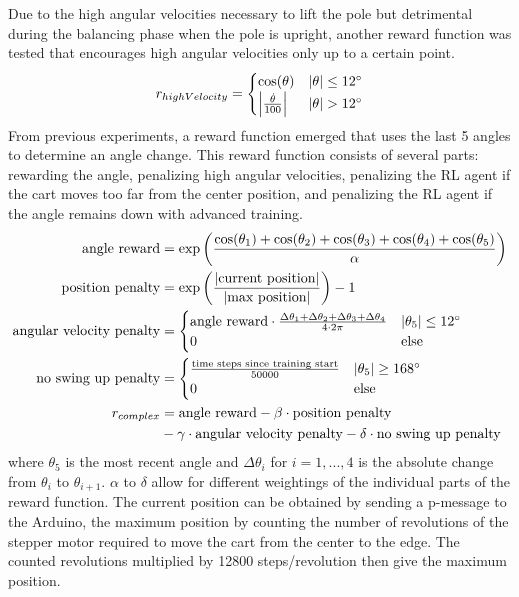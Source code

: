 Due to the high angular velocities necessary to lift the pole but detrimental during the balancing phase when the pole is upright, another reward function was tested that encourages high angular velocities only up to a certain point.
\begin{align}
    r_{highVelocity} = \begin{cases}
        \cos(\theta) & \vert\theta\vert \le 12^\circ \\
        \left|\frac{\dot{\theta}}{100}\right| & \vert\theta\vert > 12^\circ
    \end{cases} \notag
\end{align}
From previous experiments, a reward function emerged that uses the last 5 angles to determine an angle change. This reward function consists of several parts: rewarding the angle, penalizing high angular velocities, penalizing the RL agent if the cart moves too far from the center position, and penalizing the RL agent if the angle remains down with advanced training.
\begin{align}
    \text{angle reward} &= \exp\left(\frac{\cos(\theta_1) + \cos(\theta_2) + \cos(\theta_3) + \cos(\theta_4) + \cos(\theta_5)}{\alpha}\right) \notag \\
    \text{position penalty} &= \exp\left(\frac{\vert\text{current position}\vert}{\vert\text{max position}\vert}\right)-1 \notag \\
    \text{angular velocity penalty} &= \begin{cases}
        \text{angle reward}\cdot\frac{\Delta\theta_1 + \Delta\theta_2 + \Delta\theta_3 + \Delta\theta_4}{4\cdot 2\pi} & \vert\theta_5\vert \le 12^\circ \\
        0 & \text{else}
    \end{cases} \notag \\
    \text{no swing up penalty} &= \begin{cases}
        \frac{\text{time steps since training start}}{50000} & \vert\theta_5\vert \ge 168^\circ \\
        0 & \text{else}
    \end{cases} \notag \\
    r_{complex} &= \text{angle reward} - \beta\cdot \text{position penalty} \notag \\
    &- \gamma\cdot \text{angular velocity penalty} - \delta\cdot \text{no swing up penalty} \notag
\end{align}
where $\theta_5$ is the most recent angle and $\Delta\theta_i$ for $i=1,...,4$ is the absolute change from $\theta_i$ to $\theta_{i+1}$. $\alpha$ to $\delta$ allow for different weightings of the individual parts of the reward function. The current position can be obtained by sending a p-message to the Arduino, the maximum position by counting the number of revolutions of the stepper motor required to move the cart from the center to the edge. The counted revolutions multiplied by 12800 steps/revolution then give the maximum position.